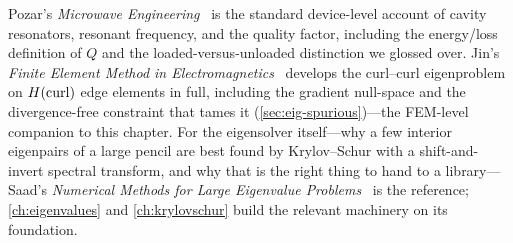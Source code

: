 \furtherreading
Pozar's \emph{Microwave Engineering}~\citep{pozar2011} is the standard
device-level account of cavity resonators, resonant frequency, and the quality
factor, including the energy/loss definition of $Q$ and the loaded-versus-unloaded
distinction we glossed over. Jin's \emph{Finite Element Method in
Electromagnetics}~\citep{jin2014} develops the curl--curl eigenproblem on
$H(\mathrm{curl})$ edge elements in full, including the gradient null-space and the
divergence-free constraint that tames it (\cref{sec:eig-spurious})---the FEM-level
companion to this chapter. For the eigensolver itself---why a few interior
eigenpairs of a large pencil are best found by Krylov--Schur with a
shift-and-invert spectral transform, and why that is the right thing to hand to a
library---Saad's \emph{Numerical Methods for Large Eigenvalue
Problems}~\citep{saad2011eig} is the reference; \cref{ch:eigenvalues} and
\cref{ch:krylovschur} build the relevant machinery on its foundation.

